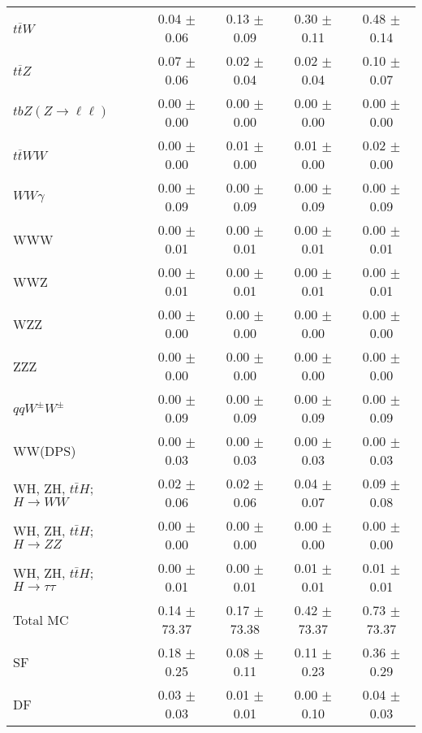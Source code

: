 \begin{tabular}{l|cccc}
                   $t\overline{t}W$ &  0.04 $\pm$  0.06 &  0.13 $\pm$  0.09 &  0.30 $\pm$  0.11 &  0.48 $\pm$  0.14 \\
                   $t\overline{t}Z$ &  0.07 $\pm$  0.06 &  0.02 $\pm$  0.04 &  0.02 $\pm$  0.04 &  0.10 $\pm$  0.07 \\
    $tbZ (Z \rightarrow \ell \ell)$ &  0.00 $\pm$  0.00 &  0.00 $\pm$  0.00 &  0.00 $\pm$  0.00 &  0.00 $\pm$  0.00 \\
                  $t\overline{t}WW$ &  0.00 $\pm$  0.00 &  0.01 $\pm$  0.00 &  0.01 $\pm$  0.00 &  0.02 $\pm$  0.00 \\
                         $WW\gamma$ &  0.00 $\pm$  0.09 &  0.00 $\pm$  0.09 &  0.00 $\pm$  0.09 &  0.00 $\pm$  0.09 \\
                                WWW &  0.00 $\pm$  0.01 &  0.00 $\pm$  0.01 &  0.00 $\pm$  0.01 &  0.00 $\pm$  0.01 \\
                                WWZ &  0.00 $\pm$  0.01 &  0.00 $\pm$  0.01 &  0.00 $\pm$  0.01 &  0.00 $\pm$  0.01 \\
                                WZZ &  0.00 $\pm$  0.00 &  0.00 $\pm$  0.00 &  0.00 $\pm$  0.00 &  0.00 $\pm$  0.00 \\
                                ZZZ &  0.00 $\pm$  0.00 &  0.00 $\pm$  0.00 &  0.00 $\pm$  0.00 &  0.00 $\pm$  0.00 \\
                 $qqW^{\pm}W^{\pm}$ &  0.00 $\pm$  0.09 &  0.00 $\pm$  0.09 &  0.00 $\pm$  0.09 &  0.00 $\pm$  0.09 \\
                            WW(DPS) &  0.00 $\pm$  0.03 &  0.00 $\pm$  0.03 &  0.00 $\pm$  0.03 &  0.00 $\pm$  0.03 \\
WH, ZH, $t\bar{t}H$; $H \rightarrow WW$ &  0.02 $\pm$  0.06 &  0.02 $\pm$  0.06 &  0.04 $\pm$  0.07 &  0.09 $\pm$  0.08 \\
WH, ZH, $t\bar{t}H$; $H \rightarrow ZZ$ &  0.00 $\pm$  0.00 &  0.00 $\pm$  0.00 &  0.00 $\pm$  0.00 &  0.00 $\pm$  0.00 \\
WH, ZH, $t\bar{t}H$; $H \rightarrow \tau\tau$ &  0.00 $\pm$  0.01 &  0.00 $\pm$  0.01 &  0.01 $\pm$  0.01 &  0.01 $\pm$  0.01 \\
\hline\hline
                           Total MC &  0.14 $\pm$ 73.37 &  0.17 $\pm$ 73.38 &  0.42 $\pm$ 73.37 &  0.73 $\pm$ 73.37 \\
\hline
                                 SF &  0.18 $\pm$  0.25 &  0.08 $\pm$  0.11 &  0.11 $\pm$  0.23 &  0.36 $\pm$  0.29 \\
                                 DF &  0.03 $\pm$  0.03 &  0.01 $\pm$  0.01 &  0.00 $\pm$  0.10 &  0.04 $\pm$  0.03 \\

\end{tabular}
